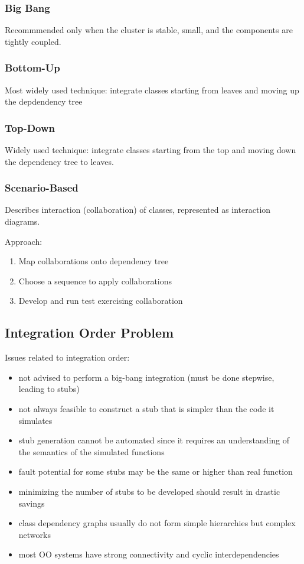 \documentclass[11pt]{article}
\begin{document}
\subsubsection{Big Bang}
\label{sec:orge2a36d0}
Recommmended only when the cluster is stable, small, and the components
are tightly coupled.
\subsubsection{Bottom-Up}
\label{sec:org31f0d86}
Most widely used technique: integrate classes starting from leaves
and moving up the depdendency tree
\subsubsection{Top-Down}
\label{sec:orgd3570e5}
Widely used technique: integrate classes starting from the top and
moving down the dependency tree to leaves.
\subsubsection{Scenario-Based}
\label{sec:org45d3fdc}
Describes interaction (collaboration) of classes, represented as
interaction diagrams.

Approach:
\begin{enumerate}
\item Map collaborations onto dependency tree
\item Choose a sequence to apply collaborations
\item Develop and run test exercising collaboration
\end{enumerate}
\subsection{Integration Order Problem}
\label{sec:org77abd4f}
Issues related to integration order:
\begin{itemize}
\item not advised to perform a big-bang integration (must be done stepwise,
leading to stubs)
\item not always feasible to construct a stub that is simpler than the
code it simulates
\item stub generation cannot be automated since it requires an
understanding of the semantics of the simulated functions
\item fault potential for some stubs may be the same or higher than
real function
\item minimizing the number of stubs to be developed should result
in drastic savings
\item class dependency graphs usually do not form simple hierarchies
but complex networks
\item most OO systems have strong connectivity and cyclic interdependencies
\end{itemize}
\end{document}
